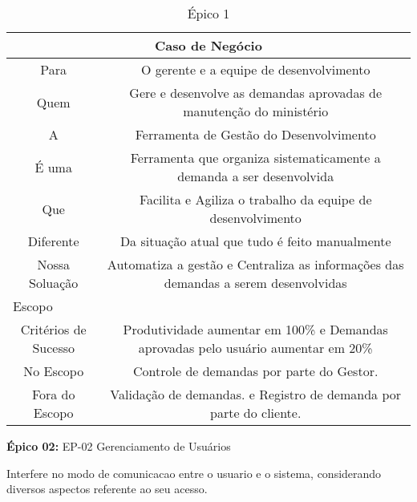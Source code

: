 \begin{table}[H]
\centering
\caption{Épico 1}
\label{epic:primeiro}
\begin{tabular}{|c|c|}
\hline
\multicolumn{2}{|m{4cm}|}{\textbf{Caso de Negócio}} \\ \hline
  Para   &   O gerente e a equipe de desenvolvimento        \\ \hline
  Quem         &    Gere e desenvolve as demandas aprovadas de manutenção do ministério        \\ \hline
    A       &     Ferramenta de Gestão do Desenvolvimento      \\ \hline
      É uma     &    Ferramenta que organiza sistematicamente a demanda a ser desenvolvida        \\ \hline
      Que     &     Facilita e Agiliza o trabalho da equipe de desenvolvimento       \\ \hline
      Diferente   &     Da situação atual que tudo é feito manualmente      \\ \hline
      Nossa Soluação  &   Automatiza a gestão e Centraliza as informações das demandas a serem desenvolvidas         \\ \hline
\multicolumn{2}{|l|}{Escopo} \\ \hline
Critérios de Sucesso  &  Produtividade aumentar em 100\% e Demandas aprovadas pelo usuário aumentar em 20\%    \\ \hline
No Escopo & Controle de demandas por parte do Gestor. \\ \hline
Fora do Escopo  & Validação de demandas. e Registro de demanda por parte do cliente.     \\ \hline
\end{tabular}
\end{table}

\textbf{Épico 02:} EP-02 Gerenciamento de Usuários

Interfere no modo de comunicacao entre o usuario e o sistema, considerando diversos aspectos referente ao seu acesso.

